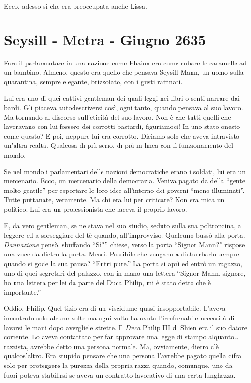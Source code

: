     Ecco, adesso sì che era preoccupata anche Lissa.

    \section{Seysill - Metra - Giugno 2635}
    Fare il parlamentare in una nazione come Phaion era come rubare le
    caramelle ad un bambino. Almeno, questo era quello che pensava Seysill
    Mann, un uomo sulla quarantina, sempre elegante, brizzolato, con i
    gusti raffinati.

    Lui era uno di quei cattivi gentleman dei quali leggi nei libri o senti
    narrare dai bardi. Gli piaceva autodescriversi così, ogni tanto, quando
    pensava al suo lavoro. Ma tornando al discorso sull'eticità del suo
    lavoro. Non è che tutti quelli che lavoravano con lui fossero dei
    corrotti bastardi, figuriamoci! In uno stato onesto come questo? E poi,
    neppure lui era corrotto. Diciamo solo che aveva intravisto un'altra
    realtà. Qualcosa di più serio, di più in linea con il funzionamento del
    mondo.

    Se nel mondo i parlamentari delle nazioni democratiche erano i soldati,
    lui era un mercenario. Ecco, un mercenario della democrazia. Veniva
    pagato da della ``gente molto gentile'' per esportare le loro idee
    all'interno dei governi ``meno illuminati''. Tutte puttanate,
    veramente. Ma chi era lui per criticare? Non era mica un politico. Lui
    era un professionista che faceva il proprio lavoro.

    E, da vero gentleman, se ne stava nel suo studio, seduto sulla sua
    poltroncina, a leggere ed a sorseggiare del tè quando, all'improvviso.
    Qualcuno bussò alla porta. \emph{Dannazione} pensò, sbuffando ``Sì?''
    chiese, verso la porta ``Signor Mann?'' rispose una voce da dietro la
    porta. Messi. Possibile che vengano a disturrbarlo sempre quando si
    gode la sua pausa? ``Entri pure.'' La porta si aprì ed entrò un
    ragazzo, uno di quei segretari del palazzo, con in mano una lettera
    ``Signor Mann, signore, ho una lettera per lei da parte del Duca
    Philip, mi è stato detto che è importante.''

    Oddio, Philip. Quel tizio era di un viscidume quasi insopportabile.
    L'aveva incontrato solo alcune volte ma ogni volta ha avuto
    l'irrefrenabile necessità di lavarsi le mani dopo avergliele strette.
    Il \emph{Duca} Philip III di Shien era il suo datore corrente. Lo aveva
    contattato per far approvare una legge di stampo alquanto\dots{}
    razzista, avrebbe detto una persona normale. Ma, ovviamente, dietro c'è
    qualcos'altro. Era stupido pensare che una persona l'avrebbe pagato
    quella cifra solo per proteggere la purezza della propria razza quando,
    comunque, uno da fuori poteva stabilirsi se aveva un contratto
    lavorativo di una certa lunghezza.

